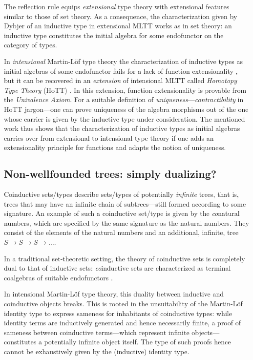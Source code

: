 \documentclass[a4paper,USenglish]{lipics}
\newcommand{\parencite}[1]{\cite{#1}}
\begin{document}
 
 The reflection rule equips \emph{extensional} type theory with extensional features similar to those of set theory.
 As a consequence, the characterization given by Dybjer \cite{DBLP:journals/tcs/Dybjer97} of an inductive type in extensional MLTT works as in set theory: 
 an inductive type constitutes the initial algebra for some endofunctor on the category of types.
  
 
 In \emph{intensional} Martin-Löf type theory the characterization of inductive types as initial algebras of some endofunctor fails 
  for a lack of function extensionality \parencite{DBLP:journals/tcs/Dybjer97}, 
  but it can be recovered \parencite{DBLP:conf/lics/AwodeyGS12} in an \emph{extension} of intensional MLTT called
  \emph{Homotopy Type Theory} (HoTT) \parencite{hottbook}.
  In this extension, function extensionality is provable from the \emph{Univalence Axiom}. 
 For a suitable definition of \emph{uniqueness}---\emph{contractibility} in HoTT jargon---one can prove uniqueness of the
 algebra morphisms out of the one whose carrier is given by the inductive type under consideration.
 The mentioned work \parencite{DBLP:conf/lics/AwodeyGS12} thus shows that the characterization of inductive types as initial algebras carries over 
 from extensional to intensional type theory if one adds an extensionality principle for functions and adapts the notion of uniqueness.
 
 
 

 \subsection{Non-wellfounded trees: simply dualizing?}\label{sec:sem_coind}

  Coinductive sets/types describe sets/types of potentially \emph{infinite} trees, that is, trees that may have an infinite chain of subtrees---still formed according to some signature.
  An example of such a coinductive set/type is given by the \emph{co}natural numbers, which are specified by the same signature as the natural numbers.
  They consist of the elements of the natural numbers and an additional,
  infinite, tree $S \longrightarrow S\longrightarrow S \longrightarrow \ldots$. 
  
 In a traditional set-theoretic setting, the theory of coinductive sets is completely dual to that of inductive sets:
  \emph{co}inductive sets are characterized as terminal coalgebras of 
 suitable endofunctors \parencite{jacobs1997tutorial}.
 
 In intensional Martin-Löf type theory, this duality between inductive and coinductive objects breaks. This is rooted in the 
 unsuitability of the Martin-Löf identity type to express sameness for inhabitants of coinductive types:
 while identity terms are inductively generated and hence necessarily finite, 
 a proof of sameness between coinductive terms---which represent infinite objects---constitutes a potentially infinite object itself.
 The type of such proofs hence cannot be exhaustively given by the (inductive) identity type.
 
\end{document}
